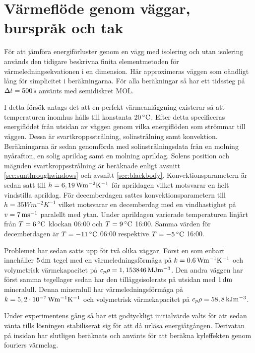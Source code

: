 \section{Värmeflöde genom väggar, burspråk och tak}

För att jämföra energiförluster genom en vägg med isolering och utan isolering används
den tidigare beskrivna finita elementmetoden för värmeledningsekvationen i en dimension. Här approximeras
väggen som oändligt lång för simplicitet i beräkningarna. För alla beräkningar så har ett tidssteg
på $\Delta t = \unit[500]{s}$ använts med semidiskret MOL.

I detta försök antags det att en perfekt värmeanläggning
existerar så att temperaturen inomhus hålls till konstanta $\unit[20]{^\circ C}$. Efter detta specificeras energiflödet
från utsidan av väggen genom vilka energiflöden som strömmar till väggen. Dessa är svartkroppsstrålning, solinstrålning
samt konvektion. Beräkningarna är sedan genomförda med solinstrålningsdata från en molning nyårafton,
en solig aprildag samt en molning aprildag. Solens position och mägnden svartkroppsstrålning är beräknade enligt avsnitt
\ref{sec:sunthroughwindows} och avsnitt \ref{sec:blackbody}.
Konvektionsparametern är sedan satt till $h=\unit[6,19]{Wm^{-2}K^{-1}}$ för aprildagen vilket motsvarar en helt vindstilla aprildag.
För decemberdagen sattes konvektionsparametern till $h=\unit{35}{Wm^{-2}K^{-1}}$ vilket motsvarar en decemberdag med en vindhastighet på $v=\unit[7]{ms^{-1}}$ paralellt
med ytan.
Under aprildagen varierade temperaturen linjärt från $T=\unit[6]{^\circ C}$ klockan 06:00 och $T=\unit[9]{^\circ C}$ 16:00.
Samma värden för decemberdagen är $T = \unit[-11]{^\circ C}$ 06:00 respektive $T=\unit[-5]{^\circ C}$ 16:00.

Problemet har sedan satts upp för två olika väggar. Först en som enbart innehåller $\unit[5]{dm}$ tegel med
en värmeledningsförmåga på $k = \unit[0.6]{Wm^{-1}K^{-1}}$ och volymetrisk värmekapacitet på
$c_{p}\rho = \unit[1,153846]{MJm^{-3}}$. Den andra väggen har först samma tegellager sedan
har den tilläggsisolerats på utsidan med $\unit[1]{dm}$ mineralull. Denna mineralull har värmeledningsförmåga på
$k = \unit[5,2\cdot 10^{-7}]{Wm^{-1}K^{-1}}$ och volymetrisk värmekapacitet på
$c_{p}\rho = \unit[58,8]{kJ m^{-3}}$. \cite{kandidatarbete2010}\cite{engineeringtoolboxdensity}\cite{bkvthermal}\cite{engineeringtoolboxspecificheat}

Under experimentens gång så har ett godtyckligt initialvärde valts för att sedan vänta tills
lösningen stabiliserat sig för att då urläsa energiåtgången. Derivatan på insidan har slutligen beräknats
och använts för att beräkna kyleffekten genom fouriers värmelag.


